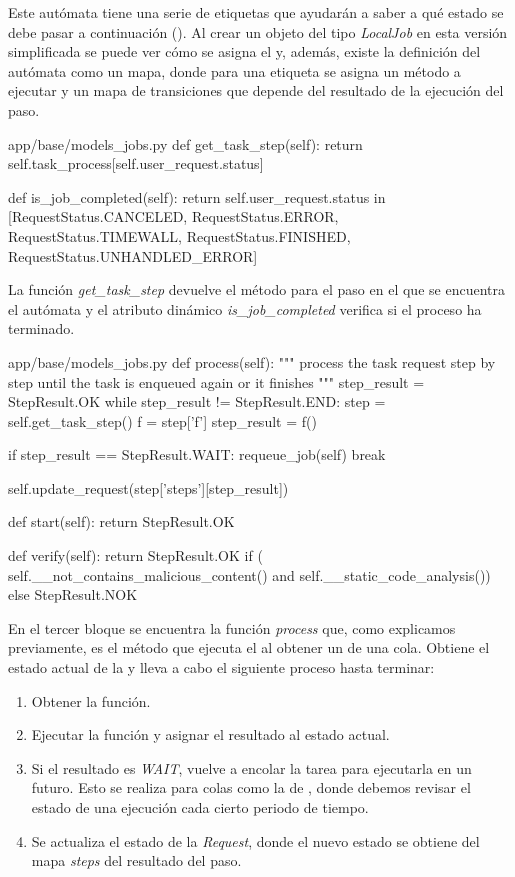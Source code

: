 \documentclass[11pt,spanish,listoffigures,listoftables]{tfgetsinf}
\begin{document}
Este autómata tiene una serie de etiquetas que ayudarán a saber a qué estado se debe pasar a continuación (). Al crear un objeto del tipo \textit{LocalJob} en esta versión simplificada se puede ver cómo se asigna el  y, además, existe la definición del autómata como un mapa, donde para una etiqueta se asigna un método a ejecutar y un mapa de transiciones que depende del resultado de la ejecución del paso. \newline
	
\begin{code}{app/base/models\_jobs.py}
	def get_task_step(self):
		return self.task_process[self.user_request.status]
	
	def is_job_completed(self):
		return self.user_request.status in [RequestStatus.CANCELED, RequestStatus.ERROR, RequestStatus.TIMEWALL,
		RequestStatus.FINISHED, RequestStatus.UNHANDLED_ERROR]
\end{code}

La función \textit{get\_task\_step} devuelve el método para el paso en el que se encuentra el autómata y el atributo dinámico \textit{is\_job\_completed} verifica si el proceso ha terminado. \newline 

\begin{code}{app/base/models\_jobs.py}
	def process(self):
		"""
		process the task request step by step until the task is enqueued again or it finishes
		"""
		step_result = StepResult.OK
		while step_result != StepResult.END:
			step = self.get_task_step()
			f = step['f']
			step_result = f()
			
			if step_result == StepResult.WAIT:
				requeue_job(self)
				break
				
			self.update_request(step['steps'][step_result])
	
	def start(self):
		return StepResult.OK
	
	def verify(self):
		return StepResult.OK if (
	self.__not_contains_malicious_content() and self.__static_code_analysis()) else StepResult.NOK
\end{code}

En el tercer bloque se encuentra la función \textit{process} que, como explicamos previamente, es el método que ejecuta el  al obtener un  de una \gls{cola}. Obtiene el estado actual de la  y lleva a cabo el siguiente proceso hasta terminar:

\begin{enumerate}
	\item Obtener la función.
	\item Ejecutar la función y asignar el resultado al estado actual.
    \item Si el resultado es \textit{WAIT}, vuelve a encolar la tarea para ejecutarla en un futuro. Esto se realiza para \gls{cola}s como la de \kahan, donde debemos revisar el estado de una ejecución cada cierto periodo de tiempo.
    \item Se actualiza el estado de la \textit{Request}, donde el nuevo estado se obtiene del mapa \textit{steps} del resultado del paso.
\end{enumerate}
\end{document}
